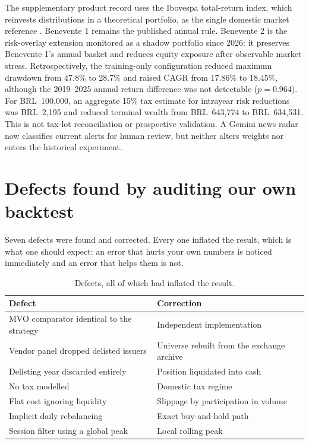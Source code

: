 \documentclass[10pt,conference]{IEEEtran}
\begin{document}
The supplementary product record uses the Ibovespa total-return index, which reinvests distributions in a theoretical portfolio, as the single domestic market reference \cite{b3ibov}. Benevente 1 remains the published annual rule. Benevente 2 is the risk-overlay extension monitored as a shadow portfolio since 2026: it preserves Benevente 1's annual basket and reduces equity exposure after observable market stress. Retrospectively, the training-only configuration reduced maximum drawdown from 47.8\% to 28.7\% and raised CAGR from 17.86\% to 18.45\%, although the 2019--2025 annual return difference was not detectable ($p=0.964$). For BRL~100,000, an aggregate 15\% tax estimate for intrayear risk reductions was BRL~2,195 and reduced terminal wealth from BRL~643,774 to BRL~634,531. This is not tax-lot reconciliation or prospective validation. A Gemini news radar now classifies current alerts for human review, but neither alters weights nor enters the historical experiment.

\section{Defects found by auditing our own backtest}

Seven defects were found and corrected. Every one inflated the result, which is what one should expect: an error that hurts your own numbers is noticed immediately and an error that helps them is not.

\begin{table}[t]
\caption{Defects, all of which had inflated the result.}
\centering
\footnotesize
\begin{tabular}{p{3.1cm}p{4.1cm}}
\toprule
Defect & Correction \\
\midrule
MVO comparator identical to the strategy & Independent implementation \\
Vendor panel dropped delisted issuers & Universe rebuilt from the exchange archive \\
Delisting year discarded entirely & Position liquidated into cash \\
No tax modelled & Domestic tax regime \\
Flat cost ignoring liquidity & Slippage by participation in volume \\
Implicit daily rebalancing & Exact buy-and-hold path \\
Session filter using a global peak & Local rolling peak \\
\bottomrule
\end{tabular}
\label{tab:defects}
\end{table}
\end{document}
